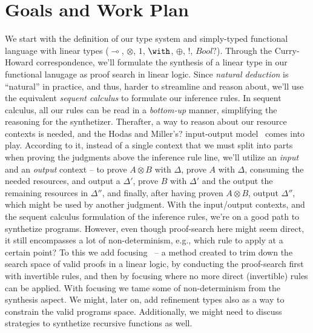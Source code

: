 \documentclass{llncs}
\newcommand{\lolli}{\multimap}
\newcommand{\tensor}{\otimes}
\newcommand{\bang}{{!}}
\begin{document}
  







\section{Goals and Work Plan}

We start with the definition of our type system and simply-typed functional language
with linear types ($\lolli$, $\tensor$, $1$, $\with$, $\oplus$, $\bang$, $Bool?$).
Through the Curry-Howard correspondence, we'll formulate the synthesis of a
linear type in our functional lanugage as proof search in linear logic.
Since \emph{natural deduction} is ``natural'' in practice, and thus, harder to streamline and reason about,
we'll use the equivalent \emph{sequent calculus} to formulate our inference rules.
In sequent calculus, all our rules can be read in a \emph{bottom-up} manner, simplifying the reasoning for the synthetizer.
Therafter, a way to reason about our resource contexts is needed, and the Hodas and Miller's? input-output model~\cite{} comes into play.
According to it, instead of a single context that we must split into parts when proving the judgments
above the inference rule line, we'll utilize an \emph{input} and an \emph{output} context -- to prove $A\tensor B$ with $\Delta$, prove $A$ with $\Delta$, consuming the needed resources, and output a $\Delta'$, prove $B$ with $\Delta'$ and the output the remaining resources in $\Delta''$, and finally, after having proven $A\tensor B$, output $\Delta''$, which might be used by another judgment.
With the input/output contexts, and the sequent calculus formulation of the inference rules, we're on a good path to synthetize programs.
However, even though proof-search here might seem direct, it still encompasses a lot of non-determinism, e.g., which rule to apply at a certain point?
To this we add focusing~\cite{} -- a method created to trim down the search space of valid proofs in a linear logic, by conducting the
proof-search first with invertible rules, and then by focusing where no more direct (invertible) rules can be applied.
With focusing we tame some of non-determinism from the synthesis aspect. 
We might, later on, add refinement types also as a way to constrain the valid programs space.
Additionally, we might need to discuss strategies to synthetize recursive functions as well.
\end{document}
